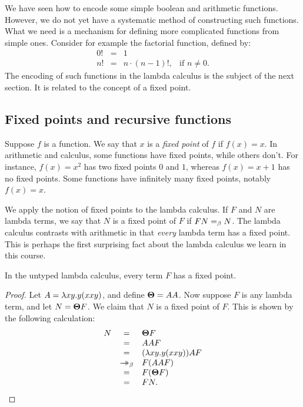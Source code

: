 \documentclass{article}
\begin{document}
We have seen how to encode some simple boolean and arithmetic
functions. However, we do not yet have a systematic method of
constructing such functions. What we need is a mechanism for defining
more complicated functions from simple ones. Consider for example the
factorial function, defined by:
\[ \begin{array}{rcll}
  0! &=& 1 \\
  n! &=& n\cdot (n-1)!,& \mbox{if $n\neq 0$}.
\end{array}
\]
The encoding of such functions in the lambda calculus is the subject
of the next section. It is related to the concept of a fixed point.

\subsection{Fixed points and recursive functions}\label{subsec-fixed-points}

Suppose $f$ is a function. We say that $x$ is a {\em fixed point} of $f$
if $f(x)=x$. In arithmetic and calculus, some functions have
fixed points, while others don't. For instance, $f(x)=x^2$ has two
fixed points $0$ and $1$, whereas $f(x)=x+1$ has no fixed points. Some
functions have infinitely many fixed points, notably $f(x)=x$. 

We apply the notion of fixed points to the lambda calculus. If $F$ and
$N$ are lambda terms, we say that $N$ is a fixed point of $F$ if $FN=_{\beta}
N$.  The lambda calculus contrasts with arithmetic in that {\em every}
lambda term has a fixed point. This is perhaps the first surprising fact
about the lambda calculus we learn in this course.

\begin{theorem}\label{thm-fix}
In the untyped lambda calculus, every term $F$ has a fixed point.
\end{theorem}

\begin{proof}
  Let $A=\lambda xy.y(xxy)$, and define $\textbf{\boldmath $\Theta$}=AA$. Now suppose $F$ is
  any lambda term, and let $N=\textbf{\boldmath $\Theta$} F$. We claim that $N$ is a
  fixed point of $F$.  This is shown by the following calculation:
\[ \begin{array}{rcl}
  N 
  &=& \textbf{\boldmath $\Theta$} F \\
  &=& AA F \\
  &=& (\lambda xy.y(xxy))AF \\
  &\mathrel{\rightarrow\!\!\!\!\!\rightarrow}_{\beta}& F(AAF) \\
  &=& F(\textbf{\boldmath $\Theta$} F) \\
  &=& FN.
\end{array}
\]
\eottwo
\end{proof}
\end{document}
